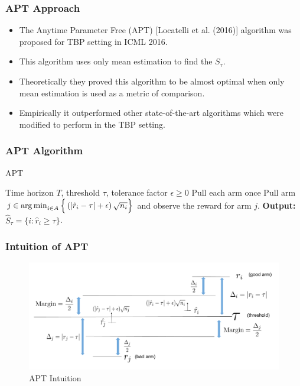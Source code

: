\begin{frame}
\frametitle{APT Approach}
\begin{itemize}
\item<1-> The Anytime Parameter Free (APT) [{Locatelli et al. (2016)}] algorithm was proposed for TBP setting in ICML 2016. 
\item<2-> This algorithm uses only mean estimation to find the $S_{\tau}$. 
\item<3-> Theoretically they proved this algorithm to be almost optimal when only mean estimation is used as a metric of comparison.
\item<4-> Empirically it outperformed other state-of-the-art algorithms which were modified to perform in the TBP setting.  
\end{itemize}
\end{frame}

\begin{frame}
\frametitle{APT Algorithm}
\begin{algorithm}[H]
\caption{APT}
\begin{algorithmic}
 Time horizon $T$, threshold $\tau$, tolerance factor $\epsilon\geq 0$
\State Pull each arm once
\vspace{-3mm}
\State {}
\State Pull arm $j\in\operatorname*{arg\,min}_{i\in A}\Big\lbrace \left(|\hat{r}_{i} - \tau | + \epsilon\right)\sqrt{n_i}\Big\rbrace$ and observe the reward for arm $j$.
\EndFor
\State \textbf{Output:} $\hat{S}_{\tau}=\lbrace i: \hat{r}_{i}\geq \tau \rbrace$.
\end{algorithmic}
\end{algorithm}
\end{frame}


\begin{frame}
\frametitle{Intuition of APT}
\begin{figure}
\caption{APT Intuition}
\includegraphics[scale=0.278]{img/APT_intuition.png}
\end{figure}
\end{frame}





